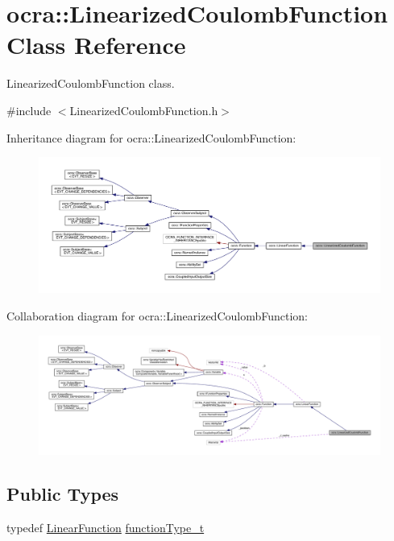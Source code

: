 \hypertarget{classocra_1_1LinearizedCoulombFunction}{}\section{ocra\+:\+:Linearized\+Coulomb\+Function Class Reference}
\label{classocra_1_1LinearizedCoulombFunction}


Linearized\+Coulomb\+Function class.  




{\ttfamily \#include $<$Linearized\+Coulomb\+Function.\+h$>$}



Inheritance diagram for ocra\+:\+:Linearized\+Coulomb\+Function\+:\nopagebreak
\begin{figure}[H]
\begin{center}
\leavevmode
\includegraphics[width=350pt]{dc/d55/classocra_1_1LinearizedCoulombFunction__inherit__graph}
\end{center}
\end{figure}


Collaboration diagram for ocra\+:\+:Linearized\+Coulomb\+Function\+:\nopagebreak
\begin{figure}[H]
\begin{center}
\leavevmode
\includegraphics[width=350pt]{d8/d0c/classocra_1_1LinearizedCoulombFunction__coll__graph}
\end{center}
\end{figure}
\subsection*{Public Types}
\begin{DoxyCompactItemize}
\item 
typedef \hyperlink{classocra_1_1LinearFunction}{Linear\+Function} \hyperlink{classocra_1_1LinearizedCoulombFunction_a3b8f1d487a59ea860aee65223cc7c6aa}{function\+Type\+\_\+t}
\end{DoxyCompactItemize}
